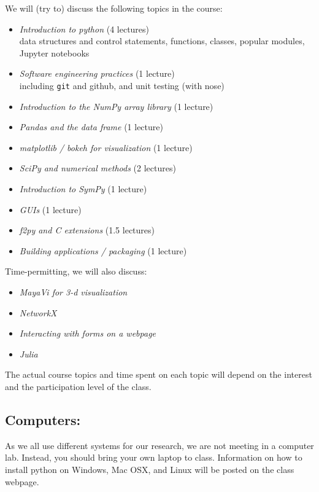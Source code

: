 \documentclass[11pt]{article}
\newenvironment{itemsquish}
  { \begin{itemize}
    \addtolength{\itemsep}{-0.25\baselineskip}
    \addtolength{\baselineskip}{-0.25\baselineskip} }
  { \end{itemize} }
\begin{document}
We will (try to) discuss the following topics in the course:
%
\begin{itemsquish}
\item {\em Introduction to python} (4 lectures) \\ data structures and
  control statements, functions, classes, popular modules, Jupyter
  notebooks

\item {\em Software engineering practices} (1 lecture) \\
  including {\tt git} and github, and unit testing (with nose)

\item {\em Introduction to the NumPy array library} (1 lecture)

\item {\em Pandas and the data frame} (1 lecture) 

\item {\em matplotlib / bokeh for visualization} (1 lecture)

\item {\em SciPy and numerical methods} (2 lectures)

\item {\em Introduction to SymPy} (1 lecture)

\item {\em GUIs} (1 lecture)

\item {\em f2py and C extensions} (1.5 lectures)

\item {\em Building applications / packaging} (1 lecture)
\end{itemsquish}

\noindent Time-permitting, we will also discuss:
\begin{itemsquish}
\item {\em MayaVi for 3-d visualization} 

\item {\em NetworkX}

\item {\em Interacting with forms on a webpage}

\item {\em Julia}
\end{itemsquish}

\noindent The actual course topics and time spent on each topic will depend on the
interest and the participation level of the class.


\subsection*{Computers:} 
%
As we all use different systems for our research, we are not meeting
in a computer lab.  Instead, you should bring your own laptop to
class.  Information on how to install python on Windows, Mac OSX, and
Linux will be posted on the class webpage. 
\end{document}
